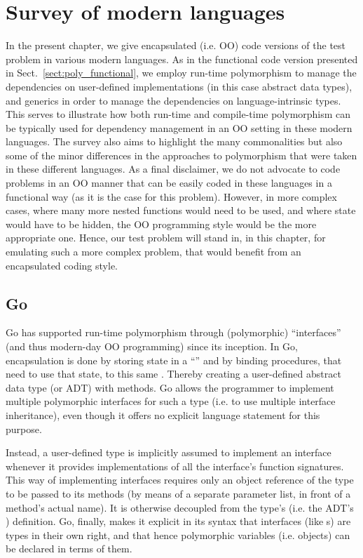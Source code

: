 \documentclass[11pt,oneside]{report}
\newcommand{\code}[1]{{\selectfont\ttfamily{#1}}}
\begin{document}
\chapter{Survey of modern languages}
\label{chapt:survey}

In the present chapter, we give encapsulated (i.e. OO) code versions
of the test problem in various modern languages. As in the functional
code version presented in Sect.~\ref{sect:poly_functional}, we employ
run-time polymorphism to manage the dependencies on user-defined
implementations (in this case abstract data types), and generics in
order to manage the dependencies on language-intrinsic types. This
serves to illustrate how both run-time and compile-time polymorphism
can be typically used for dependency management in an OO setting in
these modern languages. The survey also aims to highlight the many
commonalities but also some of the minor differences in the approaches
to polymorphism that were taken in these different languages. As a
final disclaimer, we do not advocate to code problems in an OO manner
that can be easily coded in these languages in a functional way (as it
is the case for this problem). However, in more complex cases, where
many more nested functions would need to be used, and where state
would have to be hidden, the OO programming style would be the more
appropriate one. Hence, our test problem will stand in, in this
chapter, for emulating such a more complex problem, that would
benefit from an encapsulated coding style.


\section{Go}

Go has supported run-time polymorphism through (polymorphic)
``interfaces'' (and thus modern-day OO programming) since its
inception. In Go, encapsulation is done by storing state in a
``\code{struct}'' and by binding procedures, that need to use that
state, to this same \code{struct}. Thereby creating a user-defined
abstract data type (or ADT) with methods. Go allows the programmer to
implement multiple polymorphic interfaces for such a type (i.e. to use
multiple interface inheritance), even though it offers no explicit
language statement for this purpose.

Instead, a user-defined type is implicitly assumed to implement an
interface whenever it provides implementations of all the interface's
function signatures. This way of implementing interfaces requires only
an object reference of the type to be passed to its methods (by means
of a separate parameter list, in front of a method's actual name). It
is otherwise decoupled from the type's (i.e. the ADT's \code{struct})
definition. Go, finally, makes it explicit in its syntax that
interfaces (like \code{struct}s) are types in their own right, and
that hence polymorphic variables (i.e. objects) can be declared in
terms of them.
\end{document}
